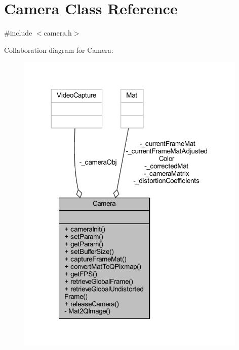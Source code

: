 \hypertarget{classCamera}{}\section{Camera Class Reference}
\label{classCamera}


{\ttfamily \#include $<$camera.\+h$>$}



Collaboration diagram for Camera\+:
\nopagebreak
\begin{figure}[H]
\begin{center}
\leavevmode
\includegraphics[width=312pt]{classCamera__coll__graph}
\end{center}
\end{figure}

